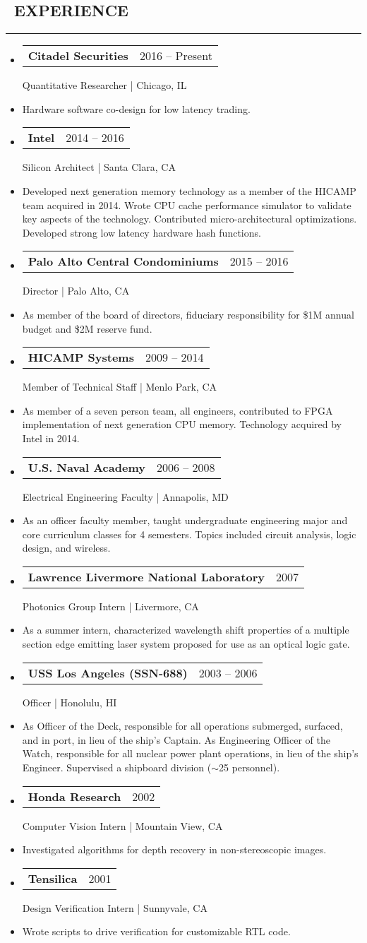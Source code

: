\documentclass[10pt,letterpaper]{article}
\makeatletter
\newenvironment{resumesection}[1]
{%
    \subsection*{\ \textcolor{light-gray}{#1} }
    \vspace{-0.4em}
    \begin{samepage}
    \hrule
    \end{samepage}
    \vspace{+0.4em}
    \begin{itemize}[leftmargin=0.15cm]
        \parskip=0.1em
}%
{%
    \end{itemize}
}%
\newcommand{\myitem}[1] {
    \item[] \textcolor{dark-gray}{#1}
}
\newcommand{\headertri}[3] {
    \item[] \begin{tabular*}{\linewidth}{l@{\extracolsep{\fill}}r}
    \textbf{#1} & #2 \\
    \end{tabular*}
    #3
}
\newcommand{\cminiw}{0.075}
\newcommand{\rminiw}{0.550}
\makeatother
\begin{document}
\begin{minipage}[t]{\cminiw\textwidth}
\end{minipage}\hfill
\begin{minipage}[t]{\rminiw\textwidth}
\begin{resumesection}{EXPERIENCE}
    \headertri
    {Citadel Securities}
    {2016 -- Present}
    {Quantitative Researcher | Chicago, IL}
    \myitem{Hardware software co-design for low latency trading.}

    \headertri
    {Intel}
    {2014 -- 2016}
    {Silicon Architect | Santa Clara, CA}
    \myitem{Developed next generation memory technology as a member of the HICAMP team acquired in 2014.
            Wrote CPU cache performance simulator to validate key aspects of the technology.
            Contributed micro-architectural optimizations.
            Developed strong low latency hardware hash functions.}

    \headertri
    {Palo Alto Central Condominiums}
    {2015 -- 2016}
    {Director | Palo Alto, CA}
    \myitem{As member of the board of directors, fiduciary responsibility for \$1M annual budget and \$2M reserve fund.}
    
    \headertri
    {HICAMP Systems}
    {2009 -- 2014}
    {Member of Technical Staff | Menlo Park, CA}
    \myitem{As member of a seven person team, all engineers, contributed to FPGA implementation
            of next generation CPU memory. Technology acquired by Intel in 2014.}
    
    \headertri
    {U.S. Naval Academy}
    {2006 -- 2008}
    {Electrical Engineering Faculty | Annapolis, MD}
    \myitem{As an officer faculty member, taught undergraduate engineering major and core curriculum classes for 4 semesters.
            Topics included circuit analysis, logic design, and wireless.}
    
    \headertri
    {Lawrence Livermore National Laboratory}
    {2007}
    {Photonics Group Intern | Livermore, CA}
    \myitem{As a summer intern, characterized wavelength shift properties of a multiple section edge emitting laser system proposed for use as an optical logic gate.}
    
    \headertri
    {USS Los Angeles (SSN-688)}
    {2003 -- 2006}
    {Officer | Honolulu, HI}
    \myitem{As Officer of the Deck, responsible for all operations submerged, surfaced, and in port, in lieu of the ship's Captain.
            As Engineering Officer of the Watch, responsible for all nuclear power plant operations, in lieu of the ship's Engineer.
            Supervised a shipboard division ({\footnotesize{$\sim$}}25 personnel).}

    \headertri
    {Honda Research}
    {2002}
    {Computer Vision Intern | Mountain View, CA}
    \myitem{Investigated algorithms for depth recovery in non-stereoscopic images.}
    
    \headertri
    {Tensilica}
    {2001}
    {Design Verification Intern | Sunnyvale, CA}
    \myitem{Wrote scripts to drive verification for customizable RTL code.}
\end{resumesection}

\end{minipage}
\end{document}
